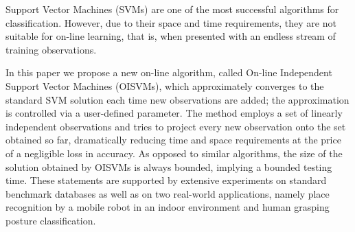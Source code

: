 Support Vector Machines (SVMs) are one of the most successful
algorithms for classification. However, due to their space and time
requirements, they are not suitable for on-line learning, that is,
when presented with an endless stream of training observations.

In this paper we propose a new on-line algorithm, called On-line
Independent Support Vector Machines (OISVMs), which approximately
converges to the standard SVM solution each time new observations
are added; the approximation is controlled via a user-defined parameter.
The method employs a set of linearly independent observations
and tries to project every new observation onto the set
obtained so far, dramatically reducing time and space requirements
at the price of a negligible loss in accuracy. As opposed to similar
algorithms, the size of the solution obtained by OISVMs is always
bounded, implying a bounded testing time. These statements are
supported by extensive experiments on standard
benchmark databases as well as on two real-world applications, namely
place recognition by a mobile robot in an indoor environment and
human grasping posture classification.
